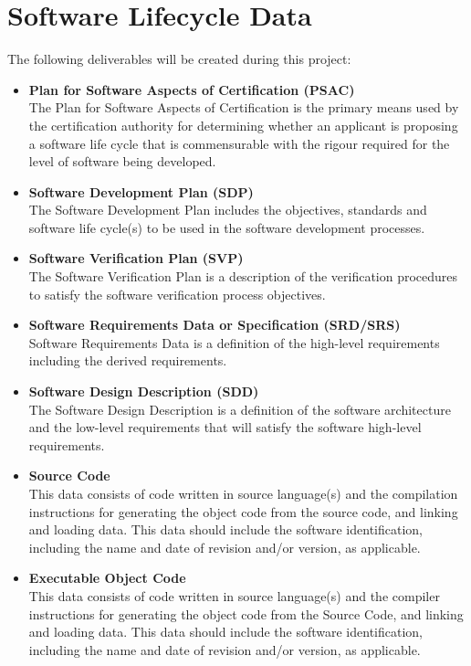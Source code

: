 \documentclass[11pt]{article}
\begin{document}
\section{Software Lifecycle Data}
The following deliverables will be created during this project:
\begin{itemize}
\item \textbf{Plan for Software Aspects of Certification (PSAC)} \\
The Plan for Software Aspects of Certification is the primary means used by the certification authority for determining whether an applicant is proposing a software life cycle that is commensurable with the rigour required for the level of software being developed.
\item \textbf{Software Development Plan (SDP)} \\
The Software Development Plan includes the objectives, standards and software life cycle(s) to be used in the software development processes.
\item \textbf{Software Verification Plan (SVP)}\\
The Software Verification Plan is a description of the verification procedures to satisfy the software verification process objectives.
\item \textbf{Software Requirements Data or Specification (SRD/SRS)} \\
Software Requirements Data is a definition of the high-level requirements including the derived requirements.
\item \textbf{Software Design Description (SDD)} \\
The Software Design Description is a definition of the software architecture and the low-level requirements that will satisfy the software high-level requirements.
\item \textbf{Source Code} \\
This data consists of code written in source language(s) and the compilation instructions for generating the object code from the source code, and linking and loading data. This data should include the software identification, including the name and date of revision and/or version, as applicable.
\item \textbf{Executable Object Code} \\
This data consists of code written in source language(s) and the compiler instructions for generating the object code from the Source Code, and linking and loading data. This data should include the software identification, including the name and date of revision and/or version, as applicable.

\end{itemize}
\end{document}
